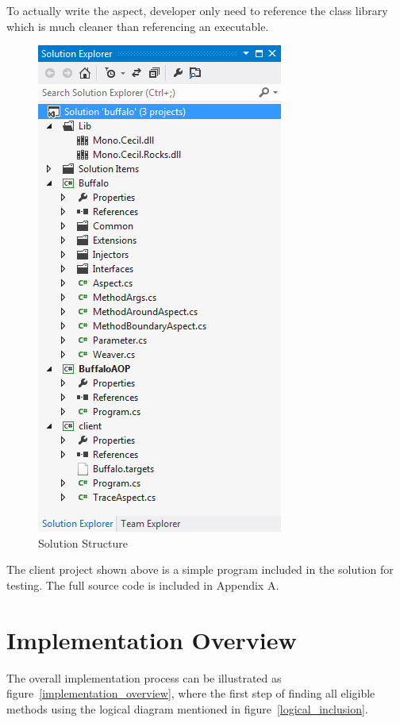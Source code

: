 To actually write the aspect, developer only need to reference the class library which is much cleaner than referencing an executable.

\begin{figure}[H]
  \includegraphics[scale=1.0]{SolutionExplorer.PNG}
  \centering
  \caption{Solution Structure\label{solutionexplorer}}
\end{figure}

The client project shown above is a simple program included in the solution for testing. The full source code is included in Appendix A.

\section{Implementation Overview}

The overall implementation process can be illustrated as figure~\ref{implementation_overview}, where the first step of finding all eligible methods using the logical diagram mentioned in figure~\ref{logical_inclusion}.


